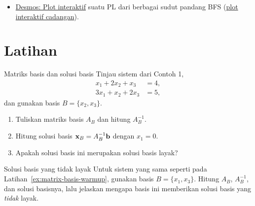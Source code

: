 \begin{resource}
\begin{itemize}
\item \href{https://www.desmos.com/calculator/j1li4l7lcv}{Desmos: Plot interaktif} suatu PL dari berbagai sudut pandang BFS (\href{https://open-optimization.github.io/open-optimization-or-book/interactive-figures/lp-graphical-method.html}{plot interaktif cadangan}).
\end{itemize}
\end{resource}

\section{Latihan}


\begin{ex}{Matriks basis dan solusi basis}{}
\label{ex:matrix-basis-warmup}
 Tinjau sistem dari Contoh 1,
\[
\begin{aligned}
    x_1 + 2x_2 + x_3 &= 4, \\
    3x_1 + x_2 + 2x_3 &= 5,
\end{aligned}
\]
dan gunakan basis \( B = \{x_2, x_3\} \).
\begin{enumerate}
    \item Tuliskan matriks basis \( A_B \) dan hitung \( A_B^{-1} \).
    \item Hitung solusi basis \( \mathbf{x}_B = A_B^{-1}\mathbf{b} \) dengan \( x_1 = 0 \).
    \item Apakah solusi basis ini merupakan solusi basis layak?
\end{enumerate}
\end{ex}

\begin{ex}{Solusi basis yang tidak layak}{}
\label{ex:matrix-infeasible-basis}
 Untuk sistem yang sama seperti pada Latihan~\ref{ex:matrix-basis-warmup}, gunakan basis \( B = \{x_1, x_3\} \).  Hitung \( A_B \), \( A_B^{-1} \), dan solusi basisnya, lalu jelaskan mengapa basis ini memberikan solusi basis yang \emph{tidak} layak.
\end{ex}

